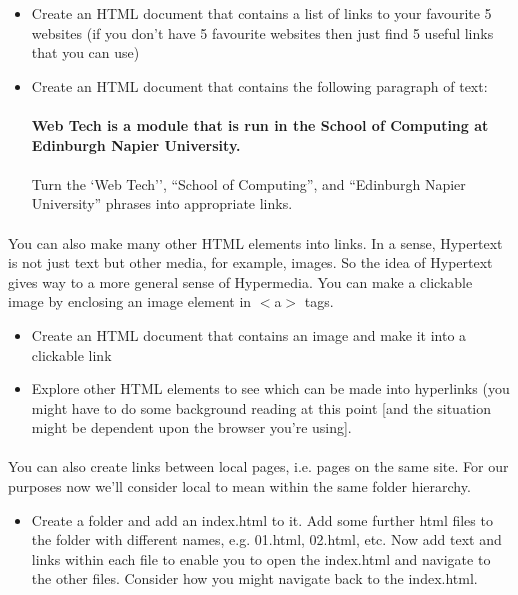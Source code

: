 \documentclass[10pt, a4paper]{article}
\begin{document}
\begin{itemize}
\item Create an HTML document that contains a list of links to your favourite 5 websites (if you don't have 5 favourite websites then just find 5 useful links that you can use)
\item Create an HTML document that contains the following paragraph of text:\\\\
{\textbf{Web Tech is a module that is run in the School of Computing at Edinburgh Napier University.}}\\\\
Turn the `Web Tech'', ``School of Computing'', and ``Edinburgh Napier University'' phrases into appropriate links.
\end{itemize}

\paragraph{} You can also make many other HTML elements into links. In a sense, Hypertext is not just text but other media, for example, images. So the idea of Hypertext gives way to a more general sense of Hypermedia. You can make a clickable image by enclosing an image element in $<$a$>$ tags.

\begin{itemize}
\item Create an HTML document that contains an image and make it into a clickable link
\item Explore other HTML elements to see which can be made into hyperlinks (you might have to do some background reading at this point [and the situation might be dependent upon the browser you're using].
\end{itemize}

\paragraph{} You can also create links between local pages, i.e. pages on the same site. For our purposes now we'll consider local to mean within the same folder hierarchy. 
\begin{itemize}
\item Create a folder and add an index.html to it. Add some further html files to the folder with different names, e.g. 01.html, 02.html, etc. Now add text and links within each file to enable you to open the index.html and navigate to the other files. Consider how you might navigate back to the index.html. 
\end{itemize}
\end{document}
